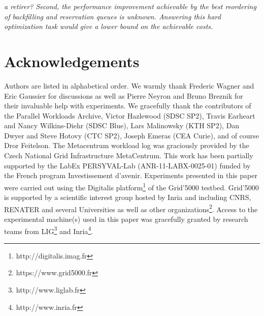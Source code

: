 \textit{ a retirer?
Second, the performance improvement achievable by the best reordering of
backfilling and reservation queues is unknown. Answering this hard optimization
task would give a lower bound on the achievable costs.
}



\section{Acknowledgements}

Authors are listed in alphabetical order. We warmly thank Frederic Wagner and
Eric Gaussier for discussions as well as Pierre Neyron and Bruno Breznik for
their invaluable help with experiments. We gracefully thank the contributors of
the Parallel Workloads Archive, Victor Hazlewood (SDSC SP2), Travis Earheart
and Nancy Wilkins-Diehr (SDSC Blue), Lars Malinowsky (KTH SP2), Dan Dwyer and
Steve Hotovy (CTC SP2), Joseph Emeras (CEA Curie), and of course Dror
Feitelson.  The Metacentrum workload log was graciously provided by the Czech
National Grid Infrastructure MetaCentrum. This work has been partially
supported by the LabEx PERSYVAL-Lab (ANR-11-LABX-0025-01) funded by the French
program Investissement d'avenir. Experiments presented in this paper were
carried out using the Digitalis platform\footnote{http://digitalis.imag.fr} of
the Grid'5000 testbed. Grid'5000 is supported by a scientific interest group
hosted by Inria and including CNRS, RENATER and several Universities as well as
other organizations\footnote{https://www.grid5000.fr}. Access to the
experimental machine(s) used in this paper was gracefully granted by research
teams from LIG\footnote{http://www.liglab.fr} and
Inria\footnote{http://www.inria.fr}.





